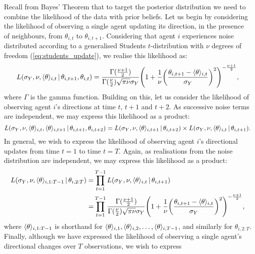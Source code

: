 Recall from Bayes' Theorem that to target the posterior distribution we need to combine
the likelihood of the data with prior beliefs. Let us begin by considering the likelihood
of observing a single agent updating its direction, in the presence of neighbours, from
$\theta_{i, t}$ to $\theta_{i, t+1}$. Considering that agent $i$ experiences noise
distributed according to a generalised Students $t$-distribution with $\nu$ degrees of
freedom (\cref{eq:students_update}), we realise this likelihood as:
\begin{equation*}
    L(\sigma_Y, \nu, \langle\theta\rangle_{i,t} \,|\, \theta_{i,t+1}, \theta_{i,t}) = 
    \frac{\Gamma(\frac{\nu +1 }{2})}{\Gamma(\frac{\nu}{2})\sqrt{\pi\nu}\sigma_Y}
        \Bigg(1 + \frac{1}{\nu}
                  \bigg(\frac{\theta_{i,t+1}-\langle\theta\rangle_{i,t}}{\sigma_Y}\bigg)^2
        \Bigg)^{-\frac{\nu+1}{2}},
\end{equation*}
where $\Gamma$ is the gamma function. Building on this, let us consider the likelihood of
observing agent $i$'s directions at time $t$, $t+1$ and $t+2$. As successive noise terms
are independent, we may express this likelihood as a product:
\begin{equation*}
    L(\sigma_Y,\nu,\langle\theta\rangle_{i,t},\langle\theta\rangle_{i,t+1}\,|\,\theta_{i,t+1},
    \theta_{i,t+2}) =
    L(\sigma_Y,\nu,\langle\theta\rangle_{i,t+1}\,|\,\theta_{i,t+2})\times
    L(\sigma_Y,\nu,\langle\theta\rangle_{i,t}\,|\,\theta_{i,t+1}).
\end{equation*}
In general, we wish to express the likelihood of observing agent $i$'s directional updates
from time $t=1$ to time $t=T$. Again, as realisations from the noise distribution are
independent, we may express this likelihood as a product:
\begin{align*}
    L(\sigma_Y, \nu, \langle\theta\rangle_{i,1:T-1} \,|\, \theta_{i,2:T})
    =& \prod_{t=1}^{T-1} L(\sigma_Y,\nu,\langle\theta\rangle_{i,t} \,|\, \theta_{i,t+1}) \\
    =& \prod_{t=1}^{T-1} 
        \frac{\Gamma(\frac{\nu +1 }{2})}{\Gamma(\frac{\nu}{2})\sqrt{\pi\nu}\sigma_Y}
        \Bigg(1 + \frac{1}{\nu}
                  \bigg(\frac{\theta_{i,t+1}-\langle\theta\rangle_{i,t}}{\sigma_Y}\bigg)^2
        \Bigg)^{-\frac{\nu+1}{2}},
\end{align*}
where $\langle\theta\rangle_{i,1:T-1}$ is shorthand for
$\langle\theta\rangle_{i,1},\langle\theta\rangle_{i,2},\ldots,\langle\theta\rangle_{i,T-1}$, and
similarly for $\theta_{i,2:T}$. Finally, although we have expressed the likelihood of
observing a single agent's directional changes over $T$ observations, we wish to express

